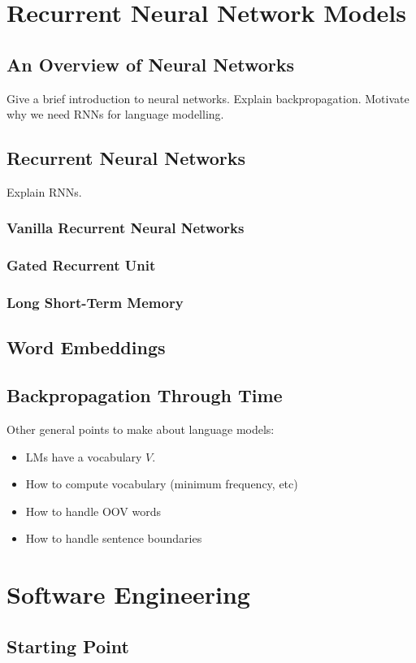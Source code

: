 \documentclass[a4paper, 12pt]{report}
\begin{document}
\section{Recurrent Neural Network Models}
\subsection{An Overview of Neural Networks}
Give a brief introduction to neural networks. Explain backpropagation. Motivate why we need RNNs for language modelling.
\subsection{Recurrent Neural Networks}
Explain RNNs.
\subsubsection{Vanilla Recurrent Neural Networks}
\subsubsection{Gated Recurrent Unit}
\subsubsection{Long Short-Term Memory}
\subsection{Word Embeddings}
\subsection{Backpropagation Through Time}

Other general points to make about language models:
\begin{itemize}
\item
	LMs have a vocabulary $V$.
\item
	How to compute vocabulary (minimum frequency, etc)
\item
	How to handle OOV words
\item
	How to handle sentence boundaries
\end{itemize}

\section{Software Engineering}
\subsection{Starting Point}
\end{document}
